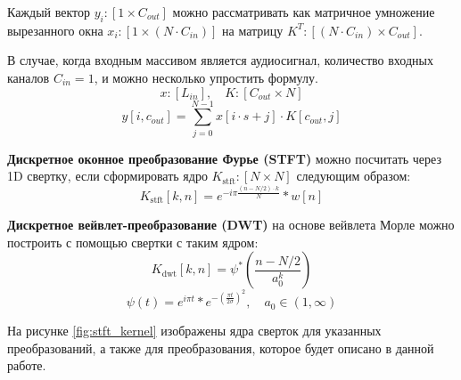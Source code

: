 Каждый вектор $y_i: [1 \times C_{out}]$ можно рассматривать как матричное умножение вырезанного окна $x_i: [1 \times (N \cdot C_{in})]$ на матрицу $K^T: [(N \cdot C_{in}) \times C_{out}]$.

В случае, когда входным массивом является аудиосигнал, количество входных каналов $C_{in} = 1$, и можно несколько упростить формулу. 
\[x: [L_{in}], \quad K: [C_{out} \times N]\]
\begin{equation}
	y[i, c_{out}] = \sum_{j=0}^{N-1} x[i \cdot s + j] \cdot K[c_{out}, j]
\end{equation}


\textbf{Дискретное оконное преобразование Фурье (STFT)} можно посчитать через 1D свертку, если сформировать ядро $K_{\mathrm{stft}}: [N \times N]$ следующим образом:
\begin{equation}
	K_{\mathrm{stft}}[k, n] = e^{-i\pi \frac{(n - N/2) \cdot k}{N}} * w[n]
\end{equation}

\textbf{Дискретное вейвлет-преобразование (DWT)} на основе вейвлета Морле можно построить с помощью свертки с таким ядром:
\begin{equation}
	K_{\mathrm{dwt}}[k, n] = \psi^* \left(\frac{n - N/2}{a_0^k}\right)
\end{equation}
\[\psi(t) = e^{i\pi t} * e^{-\left(\frac{\pi t}{2\sigma}\right)^2}, \quad   a_0 \in (1, \infty)\]

На рисунке \ref{fig:stft_kernel} изображены ядра сверток для указанных преобразований, а также для преобразования, которое будет описано в данной работе.

